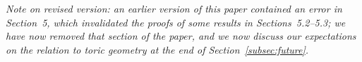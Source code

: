 \textit{Note on revised version: an earlier version of this paper contained an error in Section~{\rm 5}, which invalidated the proofs of some results in Sections~{\rm 5.2--5.3}; we have now removed that section of the paper, and we now discuss our expectations on the relation to toric geometry at the end of Section~{\rm \ref{subsec:future}}.}
